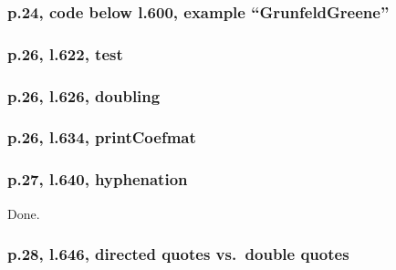 \documentclass[12pt,english]{scrartcl}
\begin{document}
\subsubsection{p.24, code below l.600, example ``GrunfeldGreene''}

\subsubsection{p.26, l.622, test}

\subsubsection{p.26, l.626, doubling}

\subsubsection{p.26, l.634, printCoefmat}

\subsubsection{p.27, l.640, hyphenation}

Done.

\subsubsection{p.28, l.646, directed quotes vs.\ double quotes}
\end{document}
